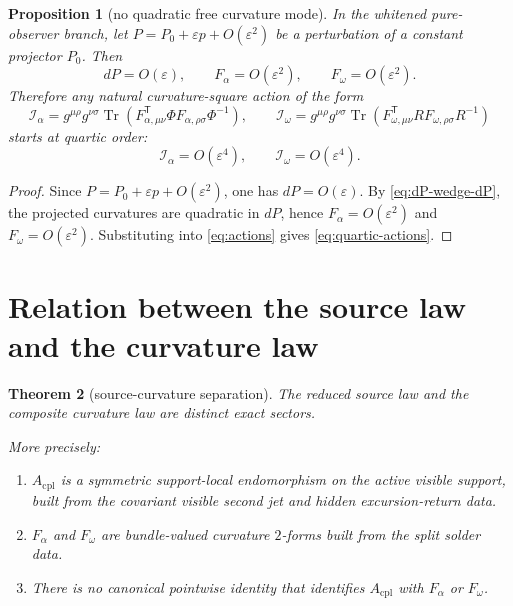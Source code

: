\documentclass[11pt,a4paper]{article}
\numberwithin{equation}{section}
\DeclareMathOperator{\Tr}{Tr}
\theoremstyle{thmcompact}
\newtheorem{theorem}{Theorem}[section]
\newtheorem{proposition}[theorem]{Proposition}
\theoremstyle{remark}
\begin{document}
\begin{proposition}[no quadratic free curvature mode]\label{prop:no-free-mode}
In the whitened pure-observer branch, let $P=P_0+\varepsilon p+O(\varepsilon^2)$ be a perturbation of a constant projector $P_0$. Then
\begin{equation}
dP=O(\varepsilon),
\qquad
F_{\alpha}=O(\varepsilon^2),
\qquad
F_{\omega}=O(\varepsilon^2).
\label{eq:curvature-order}
\end{equation}
Therefore any natural curvature-square action of the form
\begin{equation}
\mathcal I_{\alpha}=g^{\mu\rho}g^{\nu\sigma}\Tr(F_{\alpha,\mu\nu}^{\mathsf T}\Phi F_{\alpha,\rho\sigma}\Phi^{-1}),
\qquad
\mathcal I_{\omega}=g^{\mu\rho}g^{\nu\sigma}\Tr(F_{\omega,\mu\nu}^{\mathsf T}R F_{\omega,\rho\sigma}R^{-1})
\label{eq:actions}
\end{equation}
starts at quartic order:
\begin{equation}
\mathcal I_{\alpha}=O(\varepsilon^4),
\qquad
\mathcal I_{\omega}=O(\varepsilon^4).
\label{eq:quartic-actions}
\end{equation}
\end{proposition}

\begin{proof}
Since $P=P_0+\varepsilon p+O(\varepsilon^2)$, one has $dP=O(\varepsilon)$. By \eqref{eq:dP-wedge-dP}, the projected curvatures are quadratic in $dP$, hence $F_{\alpha}=O(\varepsilon^2)$ and $F_{\omega}=O(\varepsilon^2)$. Substituting into \eqref{eq:actions} gives \eqref{eq:quartic-actions}.
\end{proof}

\section{Relation between the source law and the curvature law}

\begin{theorem}[source-curvature separation]\label{thm:source-curvature-separation}
The reduced source law and the composite curvature law are distinct exact sectors.

More precisely:
\begin{enumerate}
    \item $A_{\mathrm{cpl}}$ is a symmetric support-local endomorphism on the active visible support, built from the covariant visible second jet and hidden excursion-return data.
    \item $F_{\alpha}$ and $F_{\omega}$ are bundle-valued curvature $2$-forms built from the split solder data.
    \item There is no canonical pointwise identity that identifies $A_{\mathrm{cpl}}$ with $F_{\alpha}$ or $F_{\omega}$.
\end{enumerate}
\end{theorem}
\end{document}
